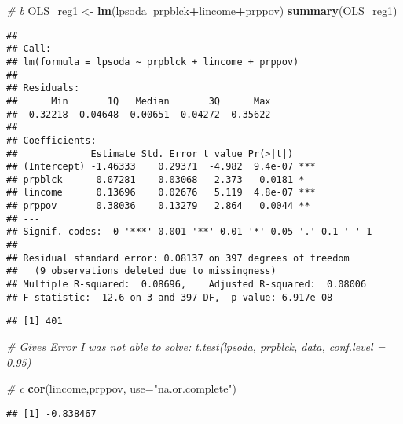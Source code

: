 \documentclass[]{article}
\newenvironment{Shaded}{\begin{snugshade}}{\end{snugshade}}
\newcommand{\CommentTok}[1]{\textcolor[rgb]{0.56,0.35,0.01}{\textit{#1}}}
\newcommand{\DataTypeTok}[1]{\textcolor[rgb]{0.13,0.29,0.53}{#1}}
\newcommand{\KeywordTok}[1]{\textcolor[rgb]{0.13,0.29,0.53}{\textbf{#1}}}
\newcommand{\NormalTok}[1]{#1}
\newcommand{\OperatorTok}[1]{\textcolor[rgb]{0.81,0.36,0.00}{\textbf{#1}}}
\newcommand{\StringTok}[1]{\textcolor[rgb]{0.31,0.60,0.02}{#1}}
\begin{document}
\begin{Shaded}
\begin{Highlighting}[]
\CommentTok{# b}
\NormalTok{OLS_reg1 <-}\StringTok{ }\KeywordTok{lm}\NormalTok{(lpsoda}\OperatorTok{~}\NormalTok{prpblck}\OperatorTok{+}\NormalTok{lincome}\OperatorTok{+}\NormalTok{prppov)}
\KeywordTok{summary}\NormalTok{(OLS_reg1)}
\end{Highlighting}
\end{Shaded}

\begin{verbatim}
## 
## Call:
## lm(formula = lpsoda ~ prpblck + lincome + prppov)
## 
## Residuals:
##      Min       1Q   Median       3Q      Max 
## -0.32218 -0.04648  0.00651  0.04272  0.35622 
## 
## Coefficients:
##             Estimate Std. Error t value Pr(>|t|)    
## (Intercept) -1.46333    0.29371  -4.982  9.4e-07 ***
## prpblck      0.07281    0.03068   2.373   0.0181 *  
## lincome      0.13696    0.02676   5.119  4.8e-07 ***
## prppov       0.38036    0.13279   2.864   0.0044 ** 
## ---
## Signif. codes:  0 '***' 0.001 '**' 0.01 '*' 0.05 '.' 0.1 ' ' 1
## 
## Residual standard error: 0.08137 on 397 degrees of freedom
##   (9 observations deleted due to missingness)
## Multiple R-squared:  0.08696,    Adjusted R-squared:  0.08006 
## F-statistic:  12.6 on 3 and 397 DF,  p-value: 6.917e-08
\end{verbatim}

\begin{Shaded}
\end{Shaded}

\begin{verbatim}
## [1] 401
\end{verbatim}

\begin{Shaded}
\begin{Highlighting}[]
\CommentTok{# Gives Error I was not able to solve: t.test(lpsoda, prpblck, data, conf.level = 0.95)}

\CommentTok{# c }
\KeywordTok{cor}\NormalTok{(lincome,prppov, }\DataTypeTok{use=}\StringTok{"na.or.complete"}\NormalTok{)}
\end{Highlighting}
\end{Shaded}

\begin{verbatim}
## [1] -0.838467
\end{verbatim}
\end{document}
